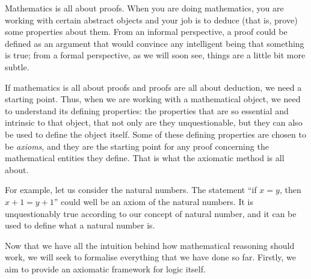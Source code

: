 \begin{para}
Mathematics is all about proofs. When you are doing mathematics, you are working with certain abstract objects and your job is to deduce (that is, prove) some properties about them.
From an informal perspective, a proof could be defined as an argument that would convince any intelligent being that something is true; from a formal perspective, as we will soon see, things are a little bit more subtle.

If mathematics is all about proofs and proofs are all about deduction, we need a starting point.
Thus, when we are working with a mathematical object, we need to understand its defining properties: the properties that are so essential and intrinsic to that object, that not only are they unquestionable, but they can also be used to define the object itself.
Some of these defining properties are chosen to be \emph{axioms}, and they are the starting point for any proof concerning the mathematical entities they define.
That is what the axiomatic method is all about.

For example, let us consider the natural numbers. The statement
``if $x = y$, then $x+1 = y+1$''
could well be an axiom of the natural numbers.
It is unquestionably true according to our concept of natural number, and it can be used to define what a natural number is.

Now that we have all the intuition behind how mathematical reasoning should work, we will seek to formalise everything that we have done so far.
Firstly, we aim to provide an axiomatic framework for logic itself.
\end{para}

